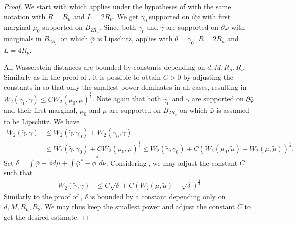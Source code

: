 \documentclass[11pt]{article}
\newcommand{\1}{\mathbbm{1}}
\numberwithin{equation}{section}
\begin{document}
\begin{proof}
    We start with  which applies under the hypotheses of   with the same notation with $R = R_\mu$ and $L = 2 R_\nu$.
    We get $\gamma_0$ supported on $\partial \bar{\varphi}$ with first marginal $\mu_0$ supported on $B_{2R_\mu}$. Since both $\gamma_0$ and $\gamma$ are supported on $\partial \bar{\varphi}$ with marginals in $B_{2R_\mu}$ on which $\bar{\varphi}$ is Lipschitz,  applies with $\theta = \gamma_0$, $R = 2 R_\mu$ and $L = 4 R_\nu$.

    
    All Wasserstein distances are bounded by constants depending on $d,M,R_\mu,R_\nu$. Similarly as in the proof of , it is possible to obtain $C>0$ by adjusting the constants in  so that only the smallest power dominates in all cases, resulting in $W_2(\gamma_0, \gamma) \leq CW_2( \mu_0,\mu)^{\frac{1}{4}}$. Note again that both $\gamma_0$ and $\gamma$ are supported on $\partial \bar{\varphi}$ and their first marginal, $\mu_0$ and $\mu$ are supported on $B_{2R_\mu}$ on which $\bar{\varphi}$ is assumed to be Lipschitz. We have
    \begin{align*}
    	W_2(\tilde{\gamma},\gamma) &\leq   W_2(\tilde{\gamma},\gamma_0) + W_2(\gamma_0, \gamma)\\
    	&\leq W_2(\tilde{\gamma},\gamma_0) + C W_2( \mu_0,\mu)^{\frac{1}{4}} \leq W_2(\tilde{\gamma},\gamma_0) + C (W_2( \mu_0,\tilde{\mu})+W_2( \mu,\tilde{\mu}))^{\frac{1}{4}}.
    \end{align*}
    Set $\delta = \int \bar{\varphi} - \tilde{\phi} d\tilde{\mu} + \int \bar{\varphi}^* - \tilde{\phi}^* d\tilde{\nu}$.
    Considering , we may adjust the constant $C$ such that
    \begin{align*}
    	W_2(\tilde{\gamma},\gamma)&\leq C \sqrt{\delta} + C \left(W_2(\mu,\tilde{\mu}) + \sqrt{\delta}\right)^{\frac{1}{4}}
    \end{align*}
     Similarly to the proof of , $\delta$ is bounded by a constant depending only on $d,M,R_\mu,R_\nu$. We may thus keep the smallest power and adjust the constant $C$ to get the desired estimate.
\end{proof} 
\end{document}
